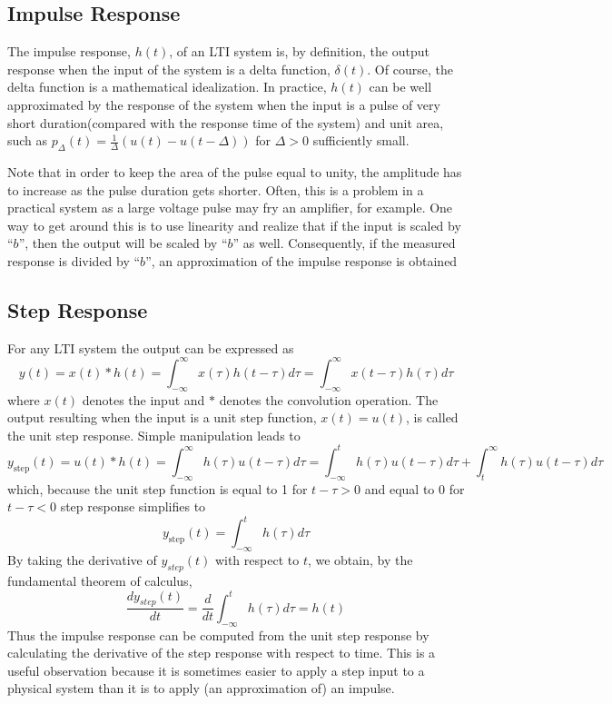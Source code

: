 \documentclass [utf8] {article}
\begin{document}
{\subsection{Impulse Response}
{
    The impulse response, $h(t)$, of an LTI system is, by definition, the output response when the input of the system is a delta function, $\delta(t)$. Of course, the delta function is a mathematical idealization. In practice, $h(t)$ can be well approximated by the response of the system when the input is a pulse of very short duration(compared with the response time of the system) and unit area, such as $p_{\Delta}(t)=\frac{1}{\Delta}(u(t)-u(t-\Delta))$ for $\Delta > 0 $ sufficiently small.
    \par Note that in order to keep the area of the pulse equal to unity, the amplitude has to increase as the pulse duration gets shorter. Often, this is a problem in a practical system as a large voltage pulse may fry an amplifier, for example. One way to get around this is to use linearity and realize that if the input is scaled by “$b$”, then the output will be scaled by “$b$” as well. Consequently, if the measured response is divided by “$b$”, an approximation of the impulse response is obtained
}
\subsection{Step Response}
{
    For any LTI system the output can be expressed as
    \[y(t)=x(t) * h(t)=\int_{-\infty}^{\infty} x(\tau) h(t-\tau) d \tau=\int_{-\infty}^{\infty} x(t-\tau) h(\tau) d \tau \tag{3}\]
    where $x(t)$ denotes the input and $*$ denotes the convolution operation. The output resulting when the input is a unit step function, $x(t) = u(t)$, is called the unit step response. Simple manipulation leads to
    \[y_{\text {step}}(t)=u(t) * h(t)=\int_{-\infty}^{\infty} h(\tau) u(t-\tau) d \tau=\int_{-\infty}^{t} h(\tau) u(t-\tau) d \tau+\int_{t}^{\infty} h(\tau) u(t-\tau) d \tau \tag{4}\]
    which, because the unit step function is equal to 1 for $t − \tau > 0$ and equal to 0 for $t − \tau < 0$ step response simplifies to
    \[y_{\text {step}}(t)=\int_{-\infty}^{t} h(\tau) d \tau \tag{5}\]
    By taking the derivative of $y_{step}(t)$ with respect to $t$, we obtain, by the fundamental theorem of calculus,
    \[\frac{d y_{s t e p}(t)}{d t}=\frac{d}{d t} \int_{-\infty}^{t} h(\tau) d \tau=h(t) \tag{6}\]
    Thus the impulse response can be computed from the unit step response by calculating the derivative of the step response with respect to time. This is a useful observation because it is sometimes easier to apply a step input to a physical system than it is to apply (an approximation of) an impulse.
}
}
\end{document}
